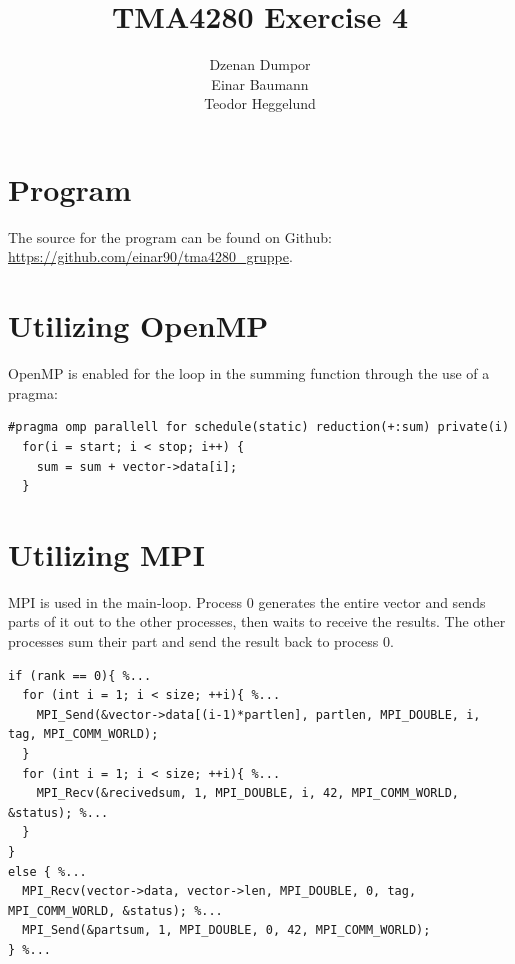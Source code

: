 

\usepackage{url}

\author{Dzenan Dumpor \\ Einar Baumann \\ Teodor Heggelund}
\title{TMA4280 Exercise 4}


\maketitle

\clearpage
\section{Program} %
\label{sec:program}
The source for the program can be found on Github: \url{https://github.com/einar90/tma4280_gruppe}.


\section{Utilizing OpenMP} %
\label{sec:utilizing_openmp}
OpenMP is enabled for the loop in the summing function through the use of a pragma:
\begin{lstlisting}
#pragma omp parallell for schedule(static) reduction(+:sum) private(i)
  for(i = start; i < stop; i++) {
    sum = sum + vector->data[i];
  }
\end{lstlisting}


\section{Utilizing MPI} %
\label{sec:utilizing_mpi}
MPI is used in the main-loop. Process 0 generates the entire vector and sends parts of it out to the other processes, then waits to receive the results. The other processes sum their part and send the result back to process 0.

\begin{lstlisting}
if (rank == 0){ %...
  for (int i = 1; i < size; ++i){ %...
    MPI_Send(&vector->data[(i-1)*partlen], partlen, MPI_DOUBLE, i, tag, MPI_COMM_WORLD);
  }
  for (int i = 1; i < size; ++i){ %...
    MPI_Recv(&recivedsum, 1, MPI_DOUBLE, i, 42, MPI_COMM_WORLD, &status); %...
  }
}
else { %...
  MPI_Recv(vector->data, vector->len, MPI_DOUBLE, 0, tag, MPI_COMM_WORLD, &status); %...
  MPI_Send(&partsum, 1, MPI_DOUBLE, 0, 42, MPI_COMM_WORLD);
} %...
\end{lstlisting}


